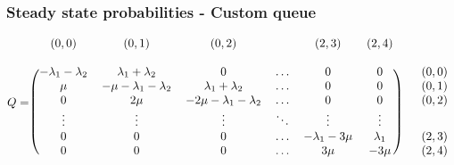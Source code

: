 \begin{frame}
    \frametitle{Steady state probabilities - Custom queue}
    \centering

    \tiny
    \begin{equation*}
        Q = 
        \begin{blockarray}{cccccccc}
            (0, 0) & (0, 1) & (0, 2) & & (2, 3) & (2, 4) & &\\
            & & & & & & & &\\
            \begin{block}{(cccccc)cc}
                -\lambda_1 - \lambda_2 & \lambda_1 + \lambda_2 & 0 & \dots & 0 & 0 & & (0,0) \\
                \mu & -\mu - \lambda_1 - \lambda_2 & \lambda_1 + \lambda_2 & \dots & 0 & 0 & & (0,1) \\
                0 & 2\mu & -2\mu - \lambda_1 - \lambda_2 & \dots & 0 & 0 & & (0,2) \\
                \vdots & \vdots & \vdots & \ddots & \vdots & \vdots \\
                0 & 0 & 0 & \dots & -\lambda_1 - 3\mu & \lambda_1 & & (2,3) \\
                0 & 0 & 0 & \dots & 3\mu & -3\mu & & (2,4) \\
            \end{block}
        \end{blockarray}    
    \end{equation*}
    \normalsize


\end{frame}
